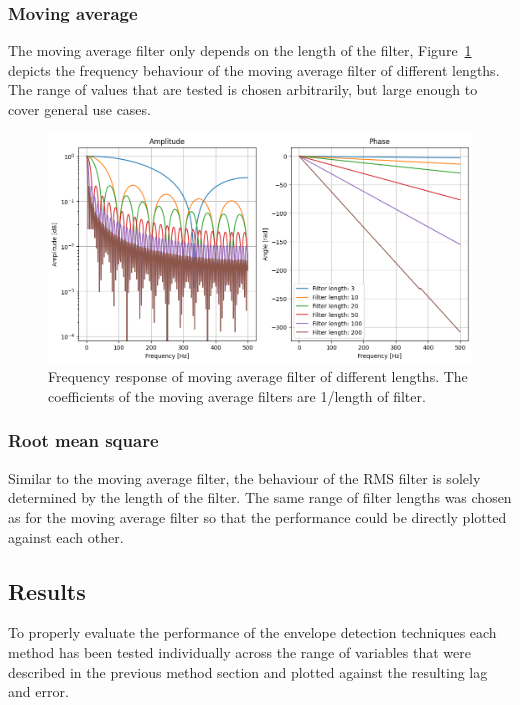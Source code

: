 \subsubsection{Moving average}
The moving average filter only depends on the length of the filter, Figure~\ref{fig:movingaverage_frequencyresponse_coefficients} depicts the frequency behaviour of the moving average filter of different lengths. The range of values that are tested is chosen arbitrarily, but large enough to cover general use cases.

\begin{figure}[h!t]
	\begin{center}
		\includegraphics[width=1.0\columnwidth]{images/movingaverage_frequencyresponse_coefficients.png}
	\end{center}
	\caption{Frequency response of moving average filter of different lengths. The coefficients of the moving average filters are 1/length of filter.}
	\label{fig:movingaverage_frequencyresponse_coefficients}
\end{figure}

\subsubsection{Root mean square}
Similar to the moving average filter, the behaviour of the RMS filter is solely determined by the length of the filter. The same range of filter lengths was chosen as for the moving average filter so that the performance could be directly plotted against each other.

\subsection{Results}
To properly evaluate the performance of the envelope detection techniques each method has been tested individually across the range of variables that were described in the previous method section and plotted against the resulting lag and error. 

